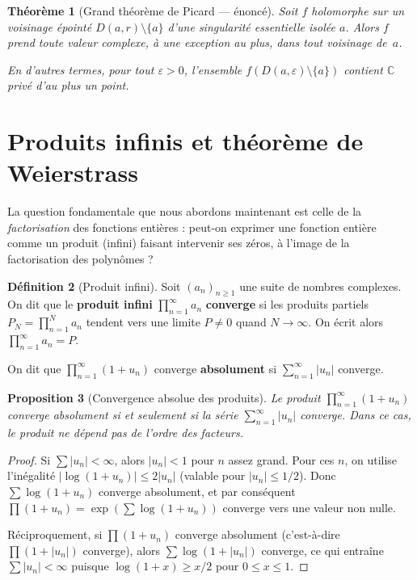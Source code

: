 \documentclass[12pt,a4paper,openany]{book}
\theoremstyle{definition}
\newtheorem{definition}{Définition}[chapter]
\theoremstyle{plain}
\newtheorem{theoreme}[definition]{Théorème}
\newtheorem{proposition}[definition]{Proposition}
\theoremstyle{remark}
\newcommand{\C}{\mathbb{C}}
\newcommand{\abs}[1]{\left|#1\right|}
\begin{document}
\begin{theoreme}[Grand théorème de Picard — énoncé]\label{thm:grand-picard}
Soit $f$ holomorphe sur un voisinage épointé $D(a, r) \setminus \{a\}$ d'une
singularité essentielle isolée $a$. Alors $f$ prend toute valeur complexe, à
une exception au plus, dans tout voisinage de~$a$.

En d'autres termes, pour tout $\varepsilon > 0$, l'ensemble
$f(D(a, \varepsilon) \setminus \{a\})$ contient $\C$ privé d'au plus un point.
\end{theoreme}

\section{Produits infinis et théorème de Weierstrass}\label{sec:weierstrass}

La question fondamentale que nous abordons maintenant est celle de la
\emph{factorisation} des fonctions entières : peut-on exprimer une fonction
entière comme un produit (infini) faisant intervenir ses zéros, à l'image
de la factorisation des polynômes ?

\begin{definition}[Produit infini]\label{def:produit-infini}
Soit $(a_n)_{n \geq 1}$ une suite de nombres complexes. On dit que le
\textbf{produit infini} $\prod_{n=1}^{\infty} a_n$ \textbf{converge} si les
produits partiels $P_N = \prod_{n=1}^N a_n$ tendent vers une limite
$P \neq 0$ quand $N \to \infty$. On écrit alors
$\prod_{n=1}^{\infty} a_n = P$.

On dit que $\prod_{n=1}^{\infty}(1 + u_n)$ converge \textbf{absolument}
si $\sum_{n=1}^{\infty} \abs{u_n}$ converge.
\end{definition}

\begin{proposition}[Convergence absolue des produits]\label{prop:produit-convergence}
Le produit $\prod_{n=1}^{\infty} (1 + u_n)$ converge absolument si et seulement
si la série $\sum_{n=1}^{\infty} \abs{u_n}$ converge. Dans ce cas, le produit
ne dépend pas de l'ordre des facteurs.
\end{proposition}

\begin{proof}
Si $\sum \abs{u_n} < \infty$, alors $\abs{u_n} < 1$ pour $n$ assez grand.
Pour ces $n$, on utilise l'inégalité $\abs{\log(1+u_n)} \leq 2\abs{u_n}$
(valable pour $\abs{u_n} \leq 1/2$). Donc $\sum \log(1 + u_n)$ converge
absolument, et par conséquent $\prod (1 + u_n) = \exp(\sum \log(1+u_n))$
converge vers une valeur non nulle.

Réciproquement, si $\prod (1 + u_n)$ converge absolument (c'est-à-dire
$\prod (1 + \abs{u_n})$ converge), alors $\sum \log(1 + \abs{u_n})$ converge,
ce qui entraîne $\sum \abs{u_n} < \infty$ puisque
$\log(1 + x) \geq x/2$ pour $0 \leq x \leq 1$.
\end{proof}
\end{document}
